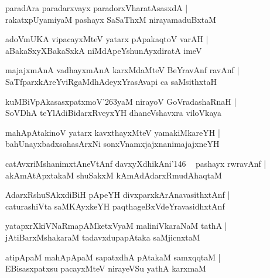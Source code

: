 \documentclass[twoside,12pt,openright]{book}
\def\S{\char'263}
\newcounter{shloka}[chapter]
\begin{document}
\begin{shloka}%
paradAra paradarxvayx paradorxVharatAsasxdA |\\
rakatxpUyamiyaM pashayx SaSaThxM nirayamaduBxtaM 
\end{shloka}

\begin{shloka}%
adoVmUKA vipacayxMteV yatarx pApakaqtoV varAH |\\
aBakaSxyXBakaSxkA niMdApeYshunAyxdiratA imeV 
\end{shloka}

\begin{shloka}%
majajxmAnA vadhayxmAnA karxMdaMteV BeYravAnf ravAnf |\\
SaTfparxkAreYviRgaMdhAdeyxYrasAvapi ca saMsithxtaH 
\end{shloka}

\begin{shloka}%
kuMBiVpAkasasxpatxmoV\S yaM nirayoV GoVradashaRnaH |\\
SoVDhA teYlAdiBidarxRveyxYH dhaneVshavxra viloVkaya 
\end{shloka}

\begin{shloka}%
mahApAtakinoV yatarx kavxthayxMteV yamakiMkareYH |\\
bahUnayxbadxsahasArxNi sonxVnamxjajxnanimajajxneYH 
\end{shloka}

\begin{shloka}%
catAvxriMshanimxtAneVtAnf davxyXdhikAni\char'146 ~ pashayx rwravAnf |\\
akAmAtApxtakaM shuSakxM kAmAdAdarxRmudAhaqtaM 
\end{shloka}

\begin{shloka}%
AdarxRshuSAkxdiBiH pApeYH divxparxkArAnavasithxtAnf |\\
caturashiVta saMKAyxkeYH paqthageBxVdeYravasidhxtAnf
\end{shloka}

\begin{shloka}%
yatapxrXkiVNaRmapAMketxVyaM maliniVkaraNaM tathA |\\
jAtiBarxMshakaraM tadavxdupapAtaka saMjicnxtaM 
\end{shloka}

\begin{shloka}%
atipApaM mahApApaM sapatxdhA pAtakaM samxqqtaM |\\
EBisasxpatxsu pacayxMteV nirayeVSu yathA karxmaM 
\end{shloka}
\end{document}
